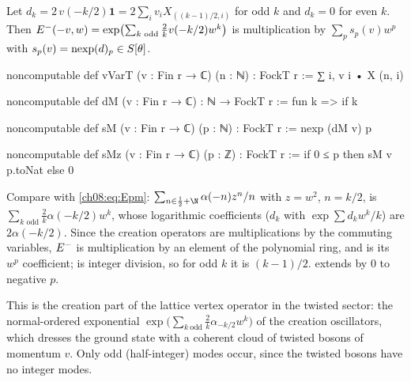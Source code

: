 \begin{definition}\label{ch08:def:sM}
Let $d_k=2\,v(-k/2)\mathbf 1=2\sum_iv_iX_{((k-1)/2,i)}$ for odd $k$ and $d_k=0$ for even $k$.  Then
$E^{-}(-v,w)=\exp\bigl(\sum_{k\text{ odd}}\frac2kv(-k/2)w^k\bigr)$ is multiplication by
$\sum_p s_p(v)w^p$ with $s_p(v)=\mathrm{nexp}(d)_p\in S[\theta]$.
\end{definition}
\begin{leancode}
noncomputable def vVarT (v : Fin r → ℂ) (n : ℕ) : FockT r := ∑ i, v i • X (n, i)

noncomputable def dM (v : Fin r → ℂ) : ℕ → FockT r :=
  fun k => if k %

noncomputable def sM (v : Fin r → ℂ) (p : ℕ) : FockT r := nexp (dM v) p

noncomputable def sMz (v : Fin r → ℂ) (p : ℤ) : FockT r := if 0 ≤ p then sM v p.toNat else 0
\end{leancode}
\begin{dictionary}
Compare with \eqref{ch08:eq:Epm}: $\sum_{n\in\frac12+\N}\alpha(-n)z^n/n$ with $z=w^2$, $n=k/2$, is
$\sum_{k\text{ odd}}\frac2k\alpha(-k/2)w^k$, whose logarithmic coefficients ($d_k$ with
$\exp\sum d_kw^k/k$) are $2\alpha(-k/2)$.  Since the creation operators are multiplications by
the commuting variables, $E^{-}$ is multiplication by an element of the polynomial ring,
and  is its $w^p$ coefficient;  is integer division, so for odd $k$ it is
$(k-1)/2$.   extends by $0$ to negative $p$.
\end{dictionary}

\begin{physics}
This is the creation part of the lattice vertex operator in the twisted sector: the normal-ordered exponential $\exp\bigl(\sum_{k\ \mathrm{odd}}\frac{2}{k}\alpha_{-k/2}w^k\bigr)$ of the creation oscillators, which dresses the ground state with a coherent cloud of twisted bosons of momentum $v$. Only odd (half-integer) modes occur, since the twisted bosons have no integer modes.
\end{physics}

